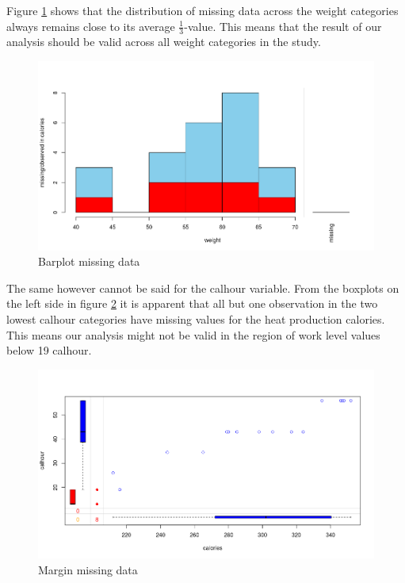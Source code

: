 \documentclass[11pt, a4paper]{article}
\begin{document}
Figure \ref{fig:barplotmiss} shows that the distribution of missing
data across the weight categories always remains close to its average
$\frac{1}{3}$-value. This means that the result of our analysis should
be valid across all weight categories in the study.

\begin{figure}[H]
    \centering
    \includegraphics[scale=.6]{barplotmiss.png}
    \caption{Barplot missing data}
    \label{fig:barplotmiss}
\end{figure}

The same however cannot be said for the calhour variable. From the
boxplots on the left side in figure \ref{fig:marginplot} it is
apparent that all but one observation in the two lowest calhour
categories have missing values for the heat production calories. This
means our analysis might not be valid in the region of work level
values below 19 calhour.

\begin{figure}[H]
    \centering
    \includegraphics[scale=.5]{marginplot.png}
    \caption{Margin missing data}
    \label{fig:marginplot}
\end{figure}
\end{document}
